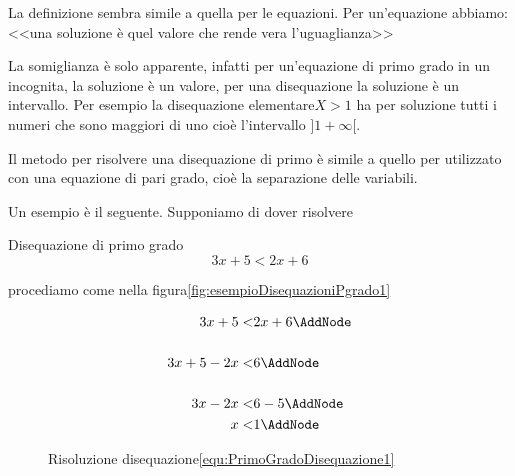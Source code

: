 La definizione sembra simile a quella per le equazioni. Per un'equazione abbiamo: <<una soluzione è quel valore che rende vera l'uguaglianza>>\par
La somiglianza è solo apparente, infatti per un'equazione di primo grado in un incognita, la soluzione è un valore, per una disequazione la soluzione è un intervallo. Per esempio la disequazione elementare$X>1$ ha per soluzione tutti i numeri che sono maggiori di uno cioè l'intervallo $]1 +\infty [$.\par
Il metodo per risolvere una disequazione di primo è simile a quello per utilizzato con una equazione di pari grado, cioè la separazione delle variabili.\par Un esempio è il seguente. Supponiamo di dover risolvere 
\begin{esempiot}{Disequazione di primo grado}{}
	\begin{equation}
	3x+5<2x+6\label{equ:PrimoGradoDisequazione1}
	\end{equation}
\end{esempiot}
procediamo come nella figura\nobs\vref{fig:esempioDisequazioniPgrado1}
\begin{figure}
	\begin{NodesList}[margin=4.5cm]
		\centering
		\begin{align*}
		3x+5<&2x+6\AddNode\\[.5cm] 
		3x+5-2x<&6\AddNode\\[.5cm] %
		3x-2x<&6-5\AddNode\\
		x<&1\AddNode
		\end{align*}
	\end{NodesList}
	\captionsetup{format=esempio,list=no}
	\caption{Risoluzione disequazione\nobs\vref{equ:PrimoGradoDisequazione1}}
	\label{fig:esempioDisequazioniPgrado1}
\end{figure}

